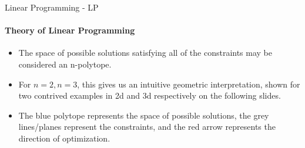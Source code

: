 \documentclass{beamer}
\begin{document}
	\begin{frame}{Linear Programming - LP}
		\framesubtitle{Theory of Linear Programming}
			\begin{itemize}
				\item The space of possible solutions satisfying all of the constraints may be considered an n-polytope.
				\item For $n=2, n=3$, this gives us an intuitive geometric interpretation, shown for two contrived examples in 2d and 3d respectively on the following slides.
				\item The blue polytope represents the space of possible solutions, the grey lines/planes represent the constraints, and the red arrow represents the direction of optimization.
			\end{itemize}
	\end{frame}	

%
\end{document}
